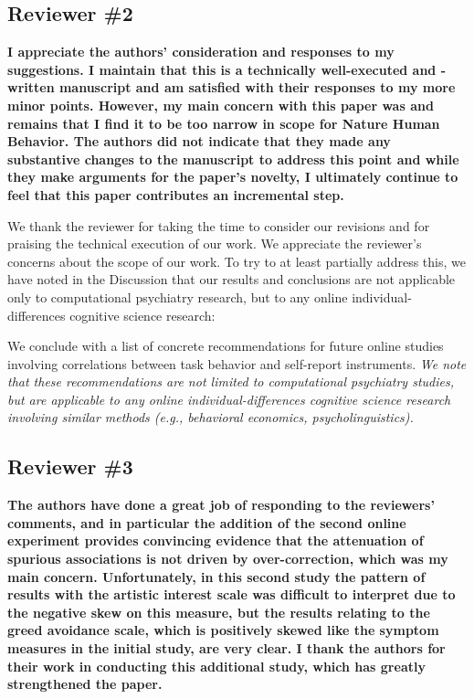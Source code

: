 \documentclass[a4paper,notitlepage,12pt]{article}
\begin{document}
\subsection*{Reviewer \#2}

\textbf{I appreciate the authors' consideration and responses to my suggestions. I maintain that this is a technically well-executed and -written manuscript and am satisfied with their responses to my more minor points. However, my main concern with this paper was and remains that I find it to be too narrow in scope for Nature Human Behavior. The authors did not indicate that they made any substantive changes to the manuscript to address this point and while they make arguments for the paper's novelty, I ultimately continue to feel that this paper contributes an incremental step.}

We thank the reviewer for taking the time to consider our revisions and for praising the technical execution of our work. We appreciate the reviewer's concerns about the scope of our work. To try to at least partially address this, we have noted in the Discussion that our results and conclusions are not applicable only to computational psychiatry research, but to any online individual-differences cognitive science research:

\begin{displayquote}
    We conclude with a list of concrete recommendations for future online studies involving correlations between task behavior and self-report instruments. \textit{We note that these recommendations are not limited to computational psychiatry studies, but are applicable to any online individual-differences cognitive science research involving similar methods (e.g., behavioral economics, psycholinguistics).}
\end{displayquote}

\subsection*{Reviewer \#3}

\textbf{The authors have done a great job of responding to the reviewers' comments, and in particular the addition of the second online experiment provides convincing evidence that the attenuation of spurious associations is not driven by over-correction, which was my main concern. Unfortunately, in this second study the pattern of results with the artistic interest scale was difficult to interpret due to the negative skew on this measure, but the results relating to the greed avoidance scale, which is positively skewed like the symptom measures in the initial study, are very clear. I thank the authors for their work in conducting this additional study, which has greatly strengthened the paper.}
\end{document}
